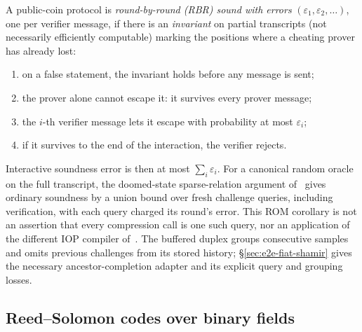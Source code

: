 \begin{definition}\label{def:rbr}
A public-coin protocol is \emph{round-by-round (RBR) sound with errors} $(\varepsilon_1, \varepsilon_2, \dots)$, one per verifier message, if there is an \emph{invariant} on partial transcripts (not necessarily efficiently computable) marking the positions where a cheating prover has already lost:
\begin{enumerate}[itemsep=1pt,label=(\roman*)]
\item on a false statement, the invariant holds before any message is sent;
\item the prover alone cannot escape it: it survives every prover message;
\item the $i$-th verifier message lets it escape with probability at most $\varepsilon_i$;
\item if it survives to the end of the interaction, the verifier rejects.
\end{enumerate}
\end{definition}

Interactive soundness error is then at most $\sum_i \varepsilon_i$. For a canonical random oracle on the full transcript, the doomed-state sparse-relation argument of~\cite[Definition 5.3 and proof of Theorem 5.8]{CCHLRR18} gives ordinary soundness by a union bound over fresh challenge queries, including verification, with each query charged its round's error. This ROM corollary is not an assertion that every compression call is one such query, nor an application of the different IOP compiler of~\cite{BCS16}. The buffered duplex groups consecutive samples and omits previous challenges from its stored history; \S\ref{sec:e2e-fiat-shamir} gives the necessary ancestor-completion adapter and its explicit query and grouping losses.

\subsection{Reed--Solomon codes over binary fields}\label{sec:binary-rs}

